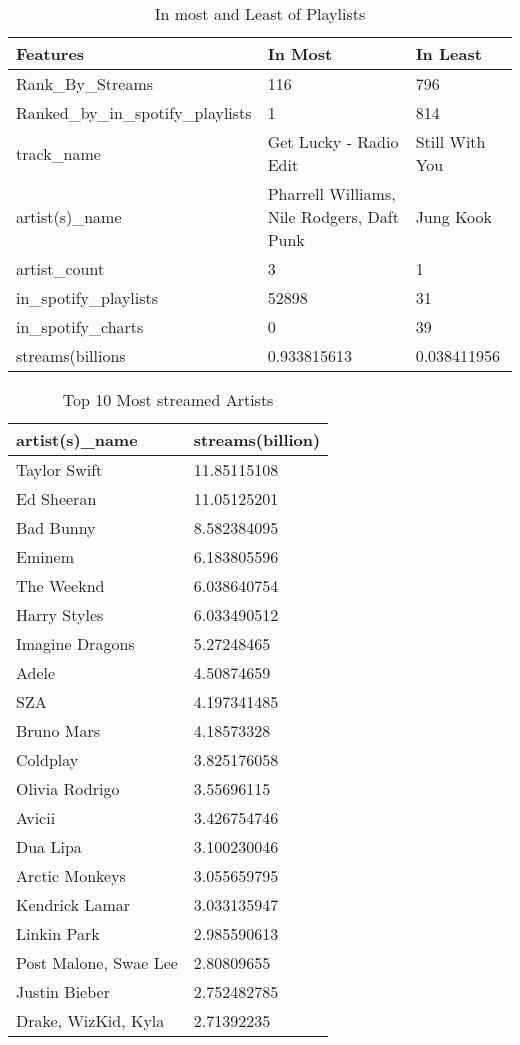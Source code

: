 \documentclass[titlepage]{article}
\begin{document}
\begin{table}[H]
    \centering
    \caption{In most and Least of Playlists}
    \begin{tabular}{lll}
    \hline
        Features & In Most & In Least \\ \hline
        Rank\_By\_Streams & 116 & 796 \\ 
        Ranked\_by\_in\_spotify\_playlists & 1 & 814 \\ 
        track\_name & Get Lucky - Radio Edit & Still With You \\ 
        artist(s)\_name & Pharrell Williams, Nile Rodgers, Daft Punk & Jung Kook \\ 
        artist\_count & 3 & 1 \\ 
        in\_spotify\_playlists & 52898 & 31 \\ 
        in\_spotify\_charts & 0 & 39 \\ 
        streams(billions & 0.933815613 & 0.038411956 \\ \hline
    \end{tabular}
\end{table}


\begin{table}[H]
    \centering
    \caption{Top 10 Most streamed Artists}
    \begin{tabular}{ll}
    \hline
        artist(s)\_name & streams(billion) \\ \hline
        Taylor Swift & 11.85115108 \\ 
        Ed Sheeran & 11.05125201 \\ 
        Bad Bunny & 8.582384095 \\ 
        Eminem & 6.183805596 \\ 
        The Weeknd & 6.038640754 \\ 
        Harry Styles & 6.033490512 \\ 
        Imagine Dragons & 5.27248465 \\ 
        Adele & 4.50874659 \\ 
        SZA & 4.197341485 \\ 
        Bruno Mars & 4.18573328 \\ 
        Coldplay & 3.825176058 \\ 
        Olivia Rodrigo & 3.55696115 \\ 
        Avicii & 3.426754746 \\ 
        Dua Lipa & 3.100230046 \\ 
        Arctic Monkeys & 3.055659795 \\ 
        Kendrick Lamar & 3.033135947 \\ 
        Linkin Park & 2.985590613 \\ 
        Post Malone, Swae Lee & 2.80809655 \\ 
        Justin Bieber & 2.752482785 \\ 
        Drake, WizKid, Kyla & 2.71392235 \\ \hline
    \end{tabular}
\end{table}
\end{document}

